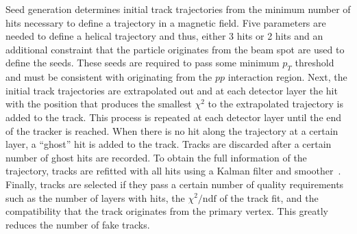 Seed generation determines initial track trajectories from the minimum number of hits necessary to define a trajectory in a magnetic field. Five parameters are needed to define a helical trajectory and thus, either 3 hits or 2 hits and an additional constraint that the particle originates from the beam spot are used to define the seeds. These seeds are required to pass some minimum $p_{T}$ threshold and must be consistent with originating from the $pp$ interaction region. Next, the initial track trajectories are extrapolated out and at each detector layer the hit with the position that produces the smallest $\chi^{2}$ to the extrapolated trajectory is added to the track. This process is repeated at each detector layer until the end of the tracker is reached. When there is no hit along the trajectory at a certain layer, a ``ghost'' hit is added to the track. Tracks are discarded after a certain number of ghost hits are recorded. To obtain the full information of the trajectory, tracks are refitted with all hits using a Kalman filter and smoother~\cite{KalmanFilter}. Finally, tracks are selected if they pass a certain number of quality requirements such as the number of layers with hits, the $\chi^{2}/\mathrm{ndf}$ of the track fit, and the compatibility that the track originates from the primary vertex. This greatly reduces the number of fake tracks. 



